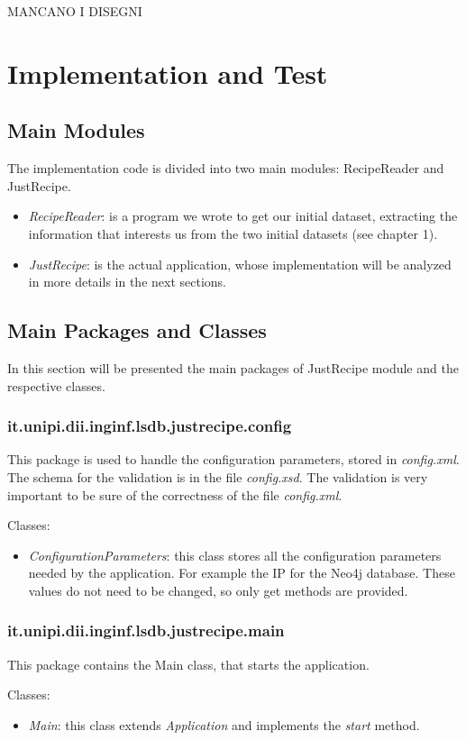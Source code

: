 \documentclass[a4paper]{report}
\begin{document}
MANCANO I DISEGNI

\chapter{Implementation and Test}
\section{Main Modules}
The implementation code is divided into two main modules: RecipeReader and JustRecipe.
 \begin{itemize}
	\item \emph{RecipeReader}:  is a program we wrote to get our initial dataset, extracting the information that interests us from the two initial datasets (see chapter 1). 
	\item \emph{JustRecipe}:  is the actual application, whose implementation will be analyzed in more details in the next sections. 
\end{itemize}
\section{Main Packages and Classes}
In this section will be presented the main packages of JustRecipe module and the respective classes.
\subsection {it.unipi.dii.inginf.lsdb.justrecipe.config}
This package is used to handle the configuration parameters, stored in \emph{config.xml}. The schema for the validation is in the file \emph{config.xsd}. The validation is very important to be sure of the correctness of the file \emph{config.xml}.

\noindent Classes:
 \begin{itemize}
	\item \emph{ConfigurationParameters}: this class stores all the configuration parameters needed by the application. For example the IP for the Neo4j database. These values do not need to be changed, so only get methods are provided. 
\end{itemize}
\subsection {it.unipi.dii.inginf.lsdb.justrecipe.main}
This package contains the Main class, that starts the application.

\noindent Classes:
 \begin{itemize}
	\item \emph{Main}: this class extends \emph{Application} and implements the \emph{start} method. 
\end{itemize}
\end{document}
